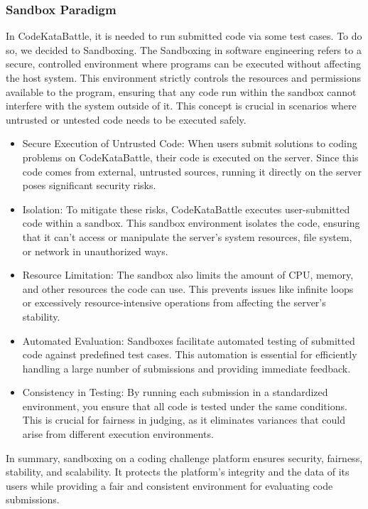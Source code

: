 \subsubsection{Sandbox Paradigm}
In CodeKataBattle, it is needed to run submitted code via some test cases. To do so, we decided to Sandboxing. The Sandboxing in software engineering refers to a secure, controlled environment where programs can be executed without affecting the host system. This environment strictly controls the resources and permissions available to the program, ensuring that any code run within the sandbox cannot interfere with the system outside of it. This concept is crucial in scenarios where untrusted or untested code needs to be executed safely.
\begin{itemize}
\item Secure Execution of Untrusted Code: When users submit solutions to coding problems on CodeKataBattle, their code is executed on the server. Since this code comes from external, untrusted sources, running it directly on the server poses significant security risks.
\item Isolation: To mitigate these risks, CodeKataBattle executes user-submitted code within a sandbox. This sandbox environment isolates the code, ensuring that it can't access or manipulate the server's system resources, file system, or network in unauthorized ways.
\item Resource Limitation: The sandbox also limits the amount of CPU, memory, and other resources the code can use. This prevents issues like infinite loops or excessively resource-intensive operations from affecting the server's stability.
\item Automated Evaluation: Sandboxes facilitate automated testing of submitted code against predefined test cases. This automation is essential for efficiently handling a large number of submissions and providing immediate feedback.
\item Consistency in Testing: By running each submission in a standardized environment, you ensure that all code is tested under the same conditions. This is crucial for fairness in judging, as it eliminates variances that could arise from different execution environments.
\end{itemize}

In summary, sandboxing on a coding challenge platform ensures security, fairness, stability, and scalability. It protects the platform's integrity and the data of its users while providing a fair and consistent environment for evaluating code submissions.


